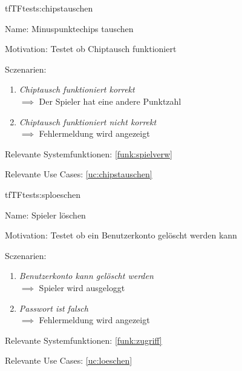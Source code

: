 \begin{description}[leftmargin=5em, style=sameline]

\begin{lhp}{tf}{TF}{tests:chipstauschen}
	\item [Name:] Minuspunktechips tauschen
	\item [Motivation:] Testet ob Chiptausch funktioniert
	\item [Sczenarien:] \hfill
		\begin{enumerate}
			\item \textit{ Chiptausch funktioniert korrekt} \\ $\implies$ Der Spieler hat eine andere Punktzahl
			
			\item \textit{Chiptausch funktioniert nicht korrekt } \\ $\implies$ Fehlermeldung wird angezeigt 
			
		\end{enumerate}
	\item [Relevante Systemfunktionen:] \ref{funk:spielverw}
	\item [Relevante Use Cases:] \ref{uc:chipstauschen}
\end{lhp}

\end{description}







\begin{description}[leftmargin=5em, style=sameline]

\begin{lhp}{tf}{TF}{tests:sploeschen}
	\item [Name:] Spieler löschen
	\item [Motivation:] Testet ob ein Benutzerkonto gelöscht werden kann
	\item [Sczenarien:] \hfill
		\begin{enumerate}
			\item \textit{Benutzerkonto kann gelöscht werden } \\ $\implies$ Spieler wird ausgeloggt
			
			\item \textit{ Passwort ist falsch} \\ $\implies$ Fehlermeldung wird angezeigt
			
		\end{enumerate}
	\item [Relevante Systemfunktionen:] \ref{funk:zugriff}
	\item [Relevante Use Cases:] \ref{uc:loeschen}
\end{lhp}

\end{description}




